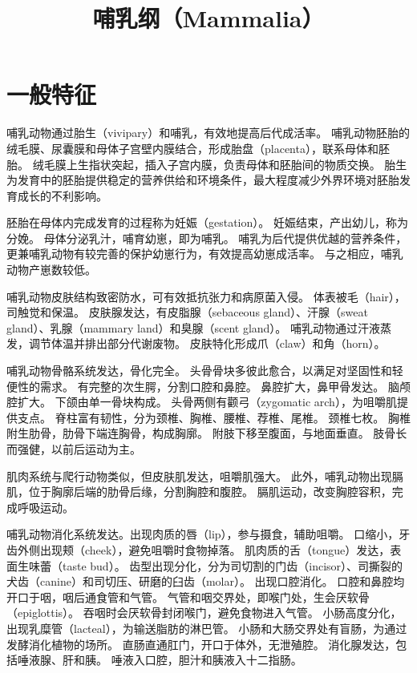 \documentclass[11pt]{article}
\title{哺乳纲（Mammalia）}
\date{}
\begin{document}
  \maketitle

  \linenumbers
\section{一般特征}
哺乳动物通过胎生（vivipary）和哺乳，有效地提高后代成活率。
哺乳动物胚胎的绒毛膜、尿囊膜和母体子宫壁内膜结合，形成胎盘（placenta），联系母体和胚胎。
绒毛膜上生指状突起，插入子宫内膜，负责母体和胚胎间的物质交换。
胎生为发育中的胚胎提供稳定的营养供给和环境条件，最大程度减少外界环境对胚胎发育成长的不利影响。

\newline

胚胎在母体内完成发育的过程称为妊娠（gestation）。
妊娠结束，产出幼儿，称为分娩。
母体分泌乳汁，哺育幼崽，即为哺乳。
哺乳为后代提供优越的营养条件，更兼哺乳动物有较完善的保护幼崽行为，有效提高幼崽成活率。
与之相应，哺乳动物产崽数较低。

\newline

哺乳动物皮肤结构致密防水，可有效抵抗张力和病原菌入侵。
体表被毛（hair），司触觉和保温。
皮肤腺发达，有皮脂腺（sebaceous gland）、汗腺（sweat gland）、乳腺（mammary land）和臭腺（scent gland）。
哺乳动物通过汗液蒸发，调节体温并排出部分代谢废物。
皮肤特化形成爪（claw）和角（horn）。

\newline

哺乳动物骨骼系统发达，骨化完全。
头骨骨块多彼此愈合，以满足对坚固性和轻便性的需求。
有完整的次生腭，分割口腔和鼻腔。
鼻腔扩大，鼻甲骨发达。
脑颅腔扩大。
下颌由单一骨块构成。
头骨两侧有颧弓（zygomatic arch），为咀嚼肌提供支点。
脊柱富有韧性，分为颈椎、胸椎、腰椎、荐椎、尾椎。
颈椎七枚。
胸椎附生肋骨，肋骨下端连胸骨，构成胸廓。
附肢下移至腹面，与地面垂直。
肢骨长而强健，以前后运动为主。

\newline

肌肉系统与爬行动物类似，但皮肤肌发达，咀嚼肌强大。
此外，哺乳动物出现膈肌，位于胸廓后端的肋骨后缘，分割胸腔和腹腔。
膈肌运动，改变胸腔容积，完成呼吸运动。

\newline

哺乳动物消化系统发达。出现肉质的唇（lip），参与摄食，辅助咀嚼。
口缩小，牙齿外侧出现颊（cheek），避免咀嚼时食物掉落。
肌肉质的舌（tongue）发达，表面生味蕾（taste bud）。
齿型出现分化，分为司切割的门齿（incisor）、司撕裂的犬齿（canine）和司切压、研磨的臼齿（molar）。
出现口腔消化。
口腔和鼻腔均开口于咽，咽后通食管和气管。
气管和咽交界处，即喉门处，生会厌软骨（epiglottis）。
吞咽时会厌软骨封闭喉门，避免食物进入气管。
小肠高度分化，出现乳糜管（lacteal），为输送脂肪的淋巴管。
小肠和大肠交界处有盲肠，为通过发酵消化植物的场所。
直肠直通肛门，开口于体外，无泄殖腔。
消化腺发达，包括唾液腺、肝和胰。
唾液入口腔，胆汁和胰液入十二指肠。
\end{document}
